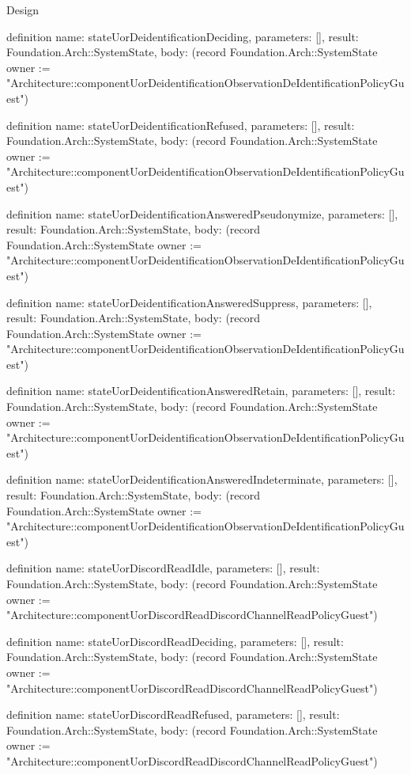 \begin{lexlean}{Design}
\begin{semanticmodule}
definition{
  name: stateUorDeidentificationDeciding,
  parameters: [],
  result: Foundation.Arch::SystemState,
  body: (record Foundation.Arch::SystemState {owner := "Architecture::componentUorDeidentificationObservationDeIdentificationPolicyGuest"})
}

definition{
  name: stateUorDeidentificationRefused,
  parameters: [],
  result: Foundation.Arch::SystemState,
  body: (record Foundation.Arch::SystemState {owner := "Architecture::componentUorDeidentificationObservationDeIdentificationPolicyGuest"})
}

definition{
  name: stateUorDeidentificationAnsweredPseudonymize,
  parameters: [],
  result: Foundation.Arch::SystemState,
  body: (record Foundation.Arch::SystemState {owner := "Architecture::componentUorDeidentificationObservationDeIdentificationPolicyGuest"})
}

definition{
  name: stateUorDeidentificationAnsweredSuppress,
  parameters: [],
  result: Foundation.Arch::SystemState,
  body: (record Foundation.Arch::SystemState {owner := "Architecture::componentUorDeidentificationObservationDeIdentificationPolicyGuest"})
}

definition{
  name: stateUorDeidentificationAnsweredRetain,
  parameters: [],
  result: Foundation.Arch::SystemState,
  body: (record Foundation.Arch::SystemState {owner := "Architecture::componentUorDeidentificationObservationDeIdentificationPolicyGuest"})
}

definition{
  name: stateUorDeidentificationAnsweredIndeterminate,
  parameters: [],
  result: Foundation.Arch::SystemState,
  body: (record Foundation.Arch::SystemState {owner := "Architecture::componentUorDeidentificationObservationDeIdentificationPolicyGuest"})
}

definition{
  name: stateUorDiscordReadIdle,
  parameters: [],
  result: Foundation.Arch::SystemState,
  body: (record Foundation.Arch::SystemState {owner := "Architecture::componentUorDiscordReadDiscordChannelReadPolicyGuest"})
}

definition{
  name: stateUorDiscordReadDeciding,
  parameters: [],
  result: Foundation.Arch::SystemState,
  body: (record Foundation.Arch::SystemState {owner := "Architecture::componentUorDiscordReadDiscordChannelReadPolicyGuest"})
}

definition{
  name: stateUorDiscordReadRefused,
  parameters: [],
  result: Foundation.Arch::SystemState,
  body: (record Foundation.Arch::SystemState {owner := "Architecture::componentUorDiscordReadDiscordChannelReadPolicyGuest"})
}


\end{semanticmodule}
\end{lexlean}
